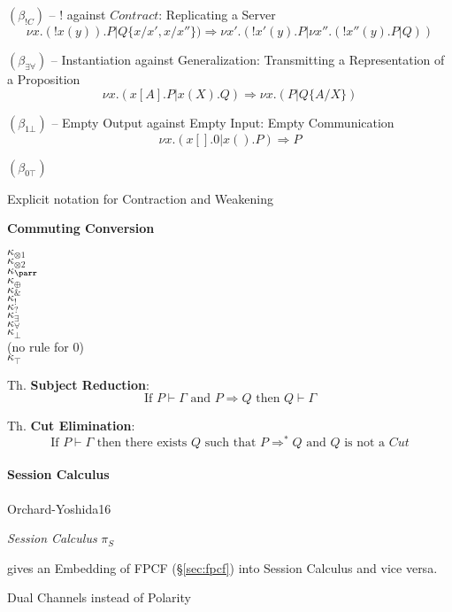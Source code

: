 $(\beta_{! C})$ -- $!$ against $Contract$: Replicating a Server
\[
  \nu x.(!x(y)).P | Q \{x/x', x/x''\}) \Longrightarrow
    \nu x'.(!x'(y).P | \nu x''.(!x''(y).P | Q))
\]

$(\beta_{\exists \forall})$ -- Instantiation against Generalization:
Transmitting a Representation of a Proposition
\[
  \nu x.(x[A].P | x(X).Q) \Longrightarrow \nu x.(P|Q\{A/X\})
\]

$(\beta_{1 \bot})$ -- Empty Output against Empty Input: Empty
Communication
\[
  \nu x.(x[].0 | x().P) \Longrightarrow P
\]

$(\beta_{0 \top})$


Explicit notation for Contraction and Weakening %


\textbf{Commuting Conversion}

$\kappa_{\otimes 1}$ \\
$\kappa_{\otimes 2}$ \\
$\kappa_\parr$ \\
$\kappa_\oplus$ \\
$\kappa_\&$ \\
$\kappa_!$ \\
$\kappa_?$ \\
$\kappa_\exists$ \\
$\kappa_\forall$ \\
$\kappa_\bot$ \\
(no rule for $0$) \\
$\kappa_\top$


Th. \textbf{Subject Reduction}:
\[
  \text{If } P \vdash \Gamma \text{ and } P \Longrightarrow Q
  \text{ then } Q \vdash \Gamma
\]

Th. \textbf{Cut Elimination}:
\[
  \text{If } P \vdash \Gamma \text{ then there exists } Q
  \text{ such that } P \Longrightarrow^* Q \text{ and } Q
  \text{ is not a } Cut
\]



\paragraph{Session Calculus}\label{sec:session_calculus}\hfill

Orchard-Yoshida16 \cite{orchard-yoshida16}

\emph{Session Calculus} $\pi_S$

\fist \cite{orchard-yoshida16} gives an Embedding of
FPCF (\S\ref{sec:fpcf}) into Session Calculus and vice versa.

Dual Channels instead of Polarity %


